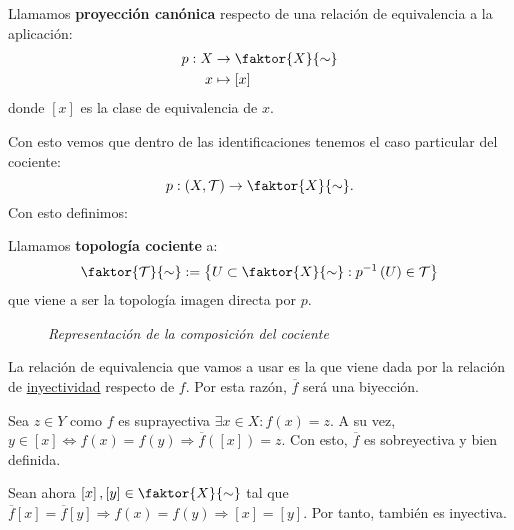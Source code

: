 \begin{defi}
Llamamos \textbf{proyección canónica} respecto de una relación de equivalencia a la aplicación:
\begin{align*}
    p: X &\rightarrow \faktor{X}{\sim}\\ 
    x &\mapsto \left[ x \right]
\end{align*}
donde $\left[ x \right]$ es la clase de equivalencia de $x$.
\end{defi}
Con esto vemos que dentro de las identificaciones tenemos el caso particular del cociente:
\[
p: \left( X, \mathcal{T} \right) \rightarrow \faktor{X}{\sim}.
\]
Con esto definimos:
\begin{defi}
Llamamos \textbf{topología cociente} a: 
\[
    \faktor{\mathcal{T}}{\sim} := \left\{ U \subset \faktor{X}{\sim}: p ^{-1}\left( U \right) \in \mathcal{T} \right\}
\]
que viene a ser la topología imagen directa por $p$.
\end{defi}

\begin{figure}[H]
    \centering    
        \caption{\textit{Representación de la composición del cociente}}
\end{figure}

\begin{obs}
La relación de equivalencia que vamos a usar es la que viene dada por la relación de \underline{inyectividad} respecto de $f$. Por esta razón, $\overline{f}$ será una biyección.
\end{obs}
\begin{demo}
Sea $z \in Y$ como $f$ es suprayectiva $\exists x \in X: f\left( x \right) = z$. A su vez, $y \in \left[ x \right] \Leftrightarrow f\left( x \right) = f\left( y \right) \Rightarrow \overline{f}\left( \left[ x \right] \right) = z$. Con esto, $\overline{f}$ es sobreyectiva y bien definida.

Sean ahora $\left[ x \right], \left[ y \right] \in \faktor{X}{\sim}$ tal que $\overline{f}\left[ x \right] = \overline{f}\left[ y \right] \Rightarrow f\left( x \right) = f\left( y \right) \Rightarrow \left[ x \right] = \left[ y \right]$. Por tanto, también es inyectiva.
\end{demo}


